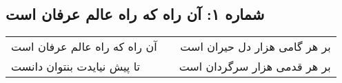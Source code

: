 \begin{center}
\section*{شماره ۱: آن راه که راه عالم عرفان است}
\label{sec:001}
\begin{longtable}{l p{0.5cm} r}
آن راه که راه عالم عرفان است
&&
بر هر گامی هزار دل حیران است 
\\
تا پیش نیایدت بنتوان دانست
&&
بر هر قدمی هزار سرگردان است
\\
\end{longtable}
\end{center}
